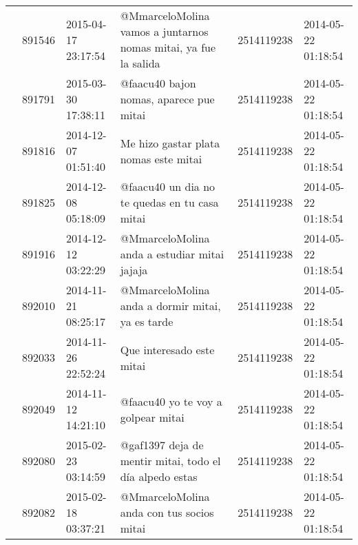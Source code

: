 \begin{tabular}{llllrl}
           & 891546  & 2015-04-17 23:17:54 &                                                                              @MmarceloMolina vamos a juntarnos nomas mitai, ya fue la salida &  2514119238 & 2014-05-22 01:18:54 \\
           & 891791  & 2015-03-30 17:38:11 &                                                                                                      @faacu40 bajon nomas, aparece pue mitai &  2514119238 & 2014-05-22 01:18:54 \\
           & 891816  & 2014-12-07 01:51:40 &                                                                                                        Me hizo gastar plata nomas este mitai &  2514119238 & 2014-05-22 01:18:54 \\
           & 891825  & 2014-12-08 05:18:09 &                                                                                                @faacu40 un dia no te quedas en tu casa mitai &  2514119238 & 2014-05-22 01:18:54 \\
           & 891916  & 2014-12-12 03:22:29 &                                                                                                 @MmarceloMolina anda a estudiar mitai jajaja &  2514119238 & 2014-05-22 01:18:54 \\
           & 892010  & 2014-11-21 08:25:17 &                                                                                             @MmarceloMolina anda a dormir mitai, ya es tarde &  2514119238 & 2014-05-22 01:18:54 \\
           & 892033  & 2014-11-26 22:52:24 &                                                                                                                    Que interesado este mitai &  2514119238 & 2014-05-22 01:18:54 \\
           & 892049  & 2014-11-12 14:21:10 &                                                                                                           @faacu40 yo te voy a golpear mitai &  2514119238 & 2014-05-22 01:18:54 \\
           & 892080  & 2015-02-23 03:14:59 &                                                                                      @gaf1397 deja de mentir mitai, todo el día alpedo estas &  2514119238 & 2014-05-22 01:18:54 \\
           & 892082  & 2015-02-18 03:37:21 &                                                                                                    @MmarceloMolina anda con tus socios mitai &  2514119238 & 2014-05-22 01:18:54 \\

\end{tabular}
